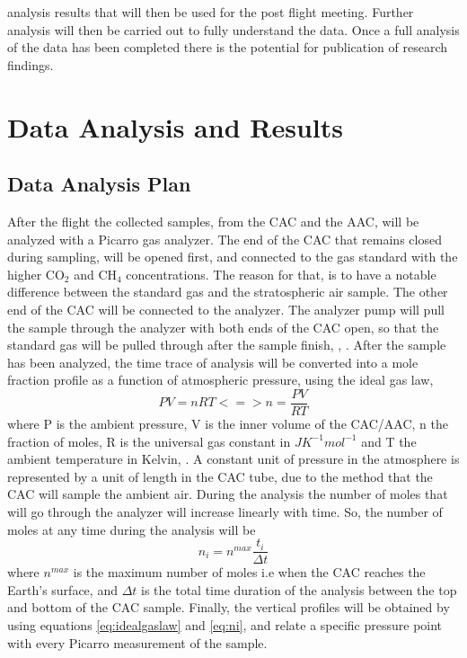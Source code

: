 \documentclass[a4paper,12pt,twoside]{article}
\providecommand{\DIFaddtex}[1]{{\protect\color{blue}\uwave{#1}}} %
\providecommand{\DIFaddend}{} %
\providecommand{\DIFadd}[1]{\texorpdfstring{\DIFaddtex{#1}}{#1}} %
\DeclareRobustCommand{\DIFaddend}{\DIFOaddend \let\includegraphics\DIFOincludegraphics} %
\begin{document}
\DIFadd{The }\DIFaddend analysis results that will then be used for the post flight meeting. Further analysis will then be carried out to fully understand the data. Once a full analysis of the data has been completed there is the potential for publication of research findings.



\pagebreak
\section{Data Analysis and Results}

\subsection{Data Analysis Plan}

After the flight the collected samples, from the CAC and the AAC, will be analyzed with a Picarro gas analyzer. The end of the CAC that remains closed during sampling, will be opened first, and connected to the gas standard with the higher CO$_2$ and CH$_4$ concentrations. The reason for that, is to have a notable difference between the standard gas and the stratospheric air sample. The other end of the CAC will be connected to the analyzer. The analyzer pump will pull the sample through the analyzer with both ends of the CAC open, so that the standard gas will be pulled through after the sample finish, \cite{Karion}, \cite{Olivier}.
After the sample has been analyzed, the time trace of analysis will be converted into a mole fraction profile as a function of atmospheric pressure, using the ideal gas law,
\begin{equation}
    PV = nRT <=> n = \frac{PV}{RT}
    \label{eq:idealgaslaw}
\end{equation}
where P is the ambient pressure, V is the inner volume of the CAC/AAC, n the fraction of moles, R is the universal gas constant in $J K^{-1} mol^{-1}$ and T the ambient temperature in Kelvin, \cite{Olivier}. 
A constant unit of pressure in the atmosphere is represented by a unit of length in the CAC tube, due to the method that the CAC will sample the ambient air.
During the analysis the number of moles that will go through the analyzer will increase linearly with time. So, the number of moles at any time during the analysis will be
\begin{equation}
    n_i = n^{max}\frac{t_i}{\Delta t}
    \label{eq:ni}
\end{equation}
where $n^{max}$ is the maximum number of moles i.e when the CAC reaches the Earth's surface, and $\Delta t$  is the total time duration of the analysis between the top and bottom of the CAC sample.   
Finally, the vertical profiles will be obtained by using equations \ref{eq:idealgaslaw} and \ref{eq:ni}, and relate a specific pressure point with every Picarro measurement of the sample.   
\end{document}
